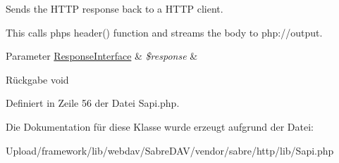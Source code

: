 Sends the H\+T\+TP response back to a H\+T\+TP client.

This calls php\textquotesingle{}s header() function and streams the body to php\+://output.


\begin{DoxyParams}[1]{Parameter}
\mbox{\hyperlink{interface_sabre_1_1_h_t_t_p_1_1_response_interface}{Response\+Interface}} & {\em \$response} & \\
\hline
\end{DoxyParams}
\begin{DoxyReturn}{Rückgabe}
void 
\end{DoxyReturn}


Definiert in Zeile 56 der Datei Sapi.\+php.



Die Dokumentation für diese Klasse wurde erzeugt aufgrund der Datei\+:\begin{DoxyCompactItemize}
\item 
Upload/framework/lib/webdav/\+Sabre\+D\+A\+V/vendor/sabre/http/lib/Sapi.\+php\end{DoxyCompactItemize}
